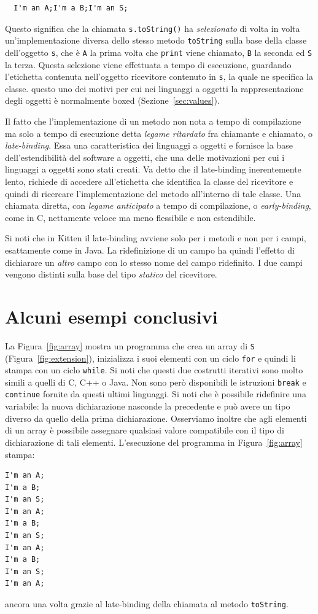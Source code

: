 %
\begin{verbatim}
  I'm an A;I'm a B;I'm an S;
\end{verbatim}
%
Questo significa che la chiamata \texttt{s.toString()} ha
\emph{selezionato} di volta in volta
un'implementazione diversa dello stesso metodo \texttt{toString} sulla base
della classe dell'oggetto \texttt{s}, che \`e \texttt{A} la prima volta che
\texttt{print} viene chiamato, \e \texttt{B} la seconda ed \e \texttt{S} la
terza. Questa selezione viene effettuata a tempo di esecuzione,
guardando l'etichetta contenuta nell'oggetto ricevitore contenuto
in \texttt{s}, la quale ne specifica la classe. \E questo uno dei motivi
per cui nei linguaggi a oggetti la rappresentazione degli oggetti \`e
normalmente boxed (Sezione~\ref{sec:values}).

Il fatto che l'implementazione di un metodo non \e nota a tempo di compilazione
ma solo a tempo di esecuzione \e detta \emph{legame ritardato} fra
chiamante e chiamato, o \emph{late-binding}. Essa \e una caratteristica dei
linguaggi a oggetti e fornisce la base dell'estendibilit\`a del
software a oggetti, che \e una
delle motivazioni per cui i linguaggi a oggetti sono stati creati. Va detto
che il late-binding \e inerentemente lento, \poiche richiede di accedere
all'etichetta che identifica la classe del ricevitore e quindi di ricercare
l'implementazione del metodo all'interno di tale classe. Una chiamata diretta,
con \emph{legame anticipato} a tempo di compilazione, o \emph{early-binding},
come in C, \e nettamente \piu veloce ma meno flessibile e non estendibile.

Si noti che in Kitten
il late-binding avviene solo per i metodi e non per i campi,
esattamente come in Java. La ridefinizione di un campo
ha quindi l'effetto di dichiarare un \emph{altro} campo con lo stesso nome del
campo ridefinito. I due campi vengono distinti sulla base del tipo
\emph{statico} del ricevitore.
%
\section{Alcuni esempi conclusivi}\label{sec:big_example}
%
La Figura~\ref{fig:array} mostra un programma che crea un array
di \texttt{S} (Figura~\ref{fig:extension}), inizializza i suoi
elementi con un ciclo \texttt{for} e quindi li stampa con un ciclo
\texttt{while}. Si noti che questi due costrutti iterativi sono molto simili
a quelli di C, C++ o Java. Non sono per\`o disponibili le istruzioni
\texttt{break} e \texttt{continue} fornite da questi ultimi linguaggi.
Si noti che \`e possibile ridefinire una variabile: la nuova
dichiarazione nasconde la precedente e pu\`o avere un tipo diverso da
quello della prima dichiarazione. Osserviamo inoltre che agli elementi
di un array \`e possibile assegnare qualsiasi valore compatibile con il
tipo di dichiarazione di tali elementi. L'esecuzione del programma
in Figura~\ref{fig:array} stampa:
%
\begin{verbatim}
I'm an A;
I'm a B;
I'm an S;
I'm an A;
I'm a B;
I'm an S;
I'm an A;
I'm a B;
I'm an S;
I'm an A;
\end{verbatim}
%
ancora una volta grazie al late-binding della chiamata al metodo
\texttt{toString}.

